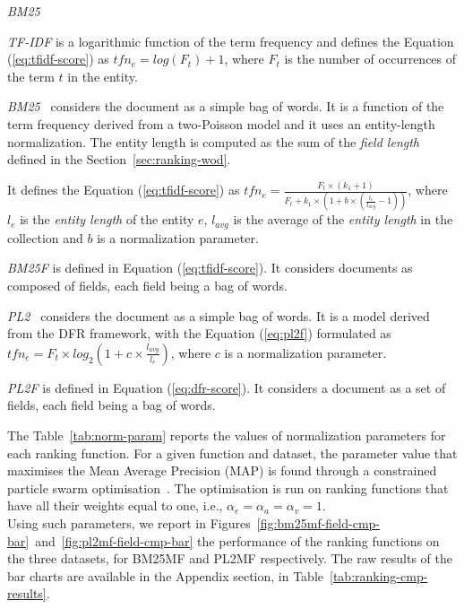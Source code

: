 \begin{labeling}{\emph{BM25~\cite{robertson:1994:sigir}}}
  \item[\emph{TF-IDF}] is a logarithmic function of the term frequency and defines the Equation (\ref{eq:tfidf-score}) as
  $
  tfn_e=log(F_t)+1
  $,
  where $F_t$ is the number of occurrences of the term $t$ in the entity.
  \item[\emph{BM25~\cite{robertson:1994:sigir}}] considers the document as a simple bag of words. It is a function of the term frequency derived from a two-Poisson model and it uses an entity-length normalization. The entity length is computed as the sum of the \emph{field length} defined in the Section~\ref{sec:ranking-wod}.

  It defines the Equation (\ref{eq:tfidf-score}) as
  $
  tfn_e=\frac{F_t\times(k_1+1)}{F_t+k_1\times \left(1+b\times\left(\frac{l_e}{l_{avg}}-1\right)\right)}
  $,
where $l_e$ is the \emph{entity length} of the entity $e$, $l_{avg}$ is the average of the \emph{entity length} in the collection and $b$ is a normalization parameter.
  \item[\emph{BM25F}] is defined in Equation (\ref{eq:tfidf-score}). It considers documents as composed of fields, each field being a bag of words.
  \item[\emph{PL2~\cite{amati:2002:acm}}] considers the document as a simple bag of words. It is a model derived from the DFR framework, with the Equation (\ref{eq:pl2f}) formulated as
  $
  tfn_e=F_t\times log_2\left(1+c\times\frac{l_{avg}}{l_e}\right)
  $,
  where $c$ is a normalization parameter.
  \item[\emph{PL2F}] is defined in Equation (\ref{eq:dfr-score}). It considers a document as a set of fields, each field being a bag of words.
\end{labeling}

The Table~\ref{tab:norm-param} reports the values of normalization parameters for each ranking function. For a given function and dataset, the parameter value that maximises the Mean Average Precision (MAP) is found through a constrained particle swarm optimisation~\cite{xiaohui:2002:sci}. The optimisation is run on ranking functions that have all their weights equal to one, i.e., $\alpha_e = \alpha_a = \alpha_v = 1$.\\



Using such parameters, we report in Figures~\ref{fig:bm25mf-field-cmp-bar}~and~\ref{fig:pl2mf-field-cmp-bar} the performance of the ranking functions on the three datasets, for BM25MF and PL2MF respectively. The raw results of the bar charts are available in the Appendix section, in Table~\ref{tab:ranking-cmp-results}.

